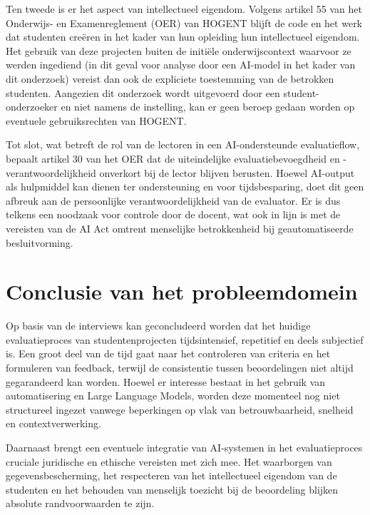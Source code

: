 \vspace{1em}

Ten tweede is er het aspect van intellectueel eigendom. Volgens artikel 55 van het Onderwijs- en Examenreglement (OER) van HOGENT blijft de code en het werk dat studenten creëren in het kader van hun opleiding hun intellectueel eigendom. Het gebruik van deze projecten buiten de initiële onderwijscontext waarvoor ze werden ingediend (in dit geval voor analyse door een AI-model in het kader van dit onderzoek) vereist dan ook de expliciete toestemming van de betrokken studenten. Aangezien dit onderzoek wordt uitgevoerd door een student-onderzoeker en niet namens de instelling, kan er geen beroep gedaan worden op eventuele gebruiksrechten van HOGENT.

\vspace{1em}

Tot slot, wat betreft de rol van de lectoren in een AI-ondersteunde evaluatieflow, bepaalt artikel 30 van het OER dat de uiteindelijke evaluatiebevoegdheid en \newline -verantwoordelijkheid onverkort bij de lector blijven berusten. Hoewel AI-output als hulpmiddel kan dienen ter ondersteuning en voor tijdsbesparing, doet dit geen afbreuk aan de persoonlijke verantwoordelijkheid van de evaluator. Er is dus telkens een noodzaak voor controle door de docent, wat ook in lijn is met de vereisten van de AI Act omtrent menselijke betrokkenheid bij geautomatiseerde besluitvorming.

\section{Conclusie van het probleemdomein}

Op basis van de interviews kan geconcludeerd worden dat het huidige evaluatieproces van studentenprojecten tijdsintensief, repetitief en deels subjectief is. Een groot deel van de tijd gaat naar het controleren van criteria en het formuleren van feedback, terwijl de consistentie tussen beoordelingen niet altijd gegarandeerd kan worden. Hoewel er interesse bestaat in het gebruik van automatisering en Large Language Models, worden deze momenteel nog niet structureel ingezet vanwege beperkingen op vlak van betrouwbaarheid, snelheid en contextverwerking.

\vspace{1em}

Daarnaast brengt een eventuele integratie van AI-systemen in het evaluatieproces cruciale juridische en ethische vereisten met zich mee. Het waarborgen van gegevensbescherming, het respecteren van het intellectueel eigendom van de studenten en het behouden van menselijk toezicht bij de beoordeling blijken absolute randvoorwaarden te zijn.

